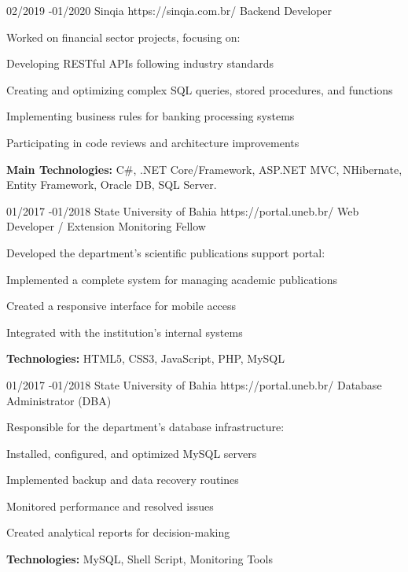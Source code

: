 \documentclass{article}
\begin{document}
\begin{job}
{02/2019 -}{01/2020}
{Sinqia}
{https://sinqia.com.br/}
{Backend Developer}%
{Worked on financial sector projects, focusing on:
  \begin{itemize-noindent}
  \item Developing RESTful APIs following industry standards
  \item Creating and optimizing complex SQL queries, stored procedures, and functions
  \item Implementing business rules for banking processing systems
  \item Participating in code reviews and architecture improvements
  \end{itemize-noindent}
  \rule{0mm}{5mm}\textbf{Main Technologies:} C\#, {.NET Core}/Framework, ASP.NET MVC, NHibernate, Entity Framework, Oracle DB, SQL Server.}
\end{job}

\begin{job}
{01/2017 -}{01/2018}
{State University of Bahia}
{https://portal.uneb.br/}
{Web Developer / Extension Monitoring Fellow}%
{Developed the department’s scientific publications support portal:
  \begin{itemize-noindent}
  \item Implemented a complete system for managing academic publications
  \item Created a responsive interface for mobile access
  \item Integrated with the institution’s internal systems
  \end{itemize-noindent}
  \rule{0mm}{5mm}\textbf{Technologies:} HTML5, CSS3, JavaScript, PHP, MySQL}
\end{job}

\begin{job}
{01/2017 -}{01/2018}
{State University of Bahia}
{https://portal.uneb.br/}
{Database Administrator (DBA)}%
{Responsible for the department’s database infrastructure:
  \begin{itemize-noindent}
  \item Installed, configured, and optimized MySQL servers
  \item Implemented backup and data recovery routines
  \item Monitored performance and resolved issues
  \item Created analytical reports for decision-making
  \end{itemize-noindent}
  \rule{0mm}{5mm}\textbf{Technologies:} MySQL, Shell Script, Monitoring Tools}
\end{job}
\end{document}
